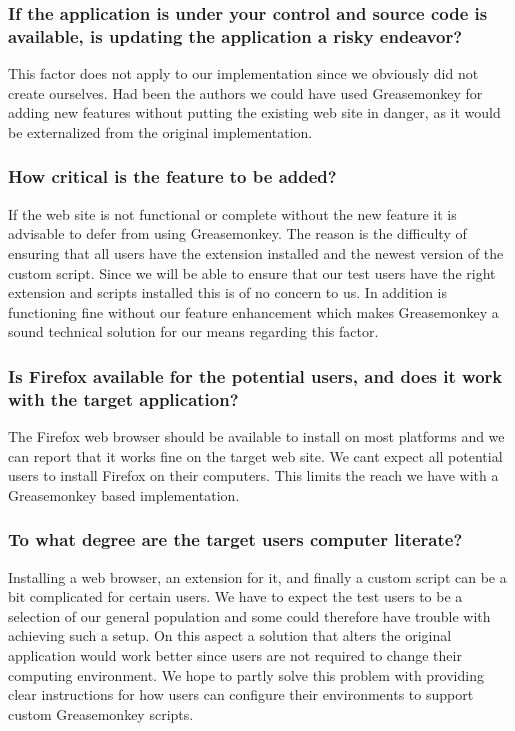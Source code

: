 \subsubsection{If the application is under your control and source code is
  available, is updating the application a risky endeavor?}

This factor does not apply to our implementation since we obviously did not
create \urort{} ourselves. Had been the authors we could have used
Greasemonkey for adding new features without putting the existing web
site in danger, as it would be externalized from the original implementation.

\subsubsection{How critical is the feature to be added?}

If the web site is not functional or complete without the new feature
it is advisable to defer from using Greasemonkey. The reason is the
difficulty of ensuring that all users have the extension installed
and the newest version of the custom script. Since we will be able
to ensure that our test users have the right extension and scripts
installed this is of no concern to us. In addition \urort{} is
functioning fine without our feature enhancement which makes
Greasemonkey a sound technical solution for our means regarding this factor.


\subsubsection{Is Firefox available for the potential users, and does it
  work with the target application?}

The Firefox web browser should be available to install on most platforms
and we can report that it works fine on the target web site.
We cant expect all potential users to install Firefox on their
computers. This limits the reach we have with a Greasemonkey based
implementation.

\subsubsection{To what degree are the target users computer literate?}

Installing a web browser, an extension for it, and finally a custom script
can be a bit complicated for certain users. We have to expect the
test users to be a selection of our general population and some could
therefore have trouble with achieving such a setup. On this aspect
a solution that alters the original application would work better
since users are not required to change their computing environment.
We hope to partly solve this problem with providing clear instructions
for how users can configure their environments to support custom
Greasemonkey scripts.

